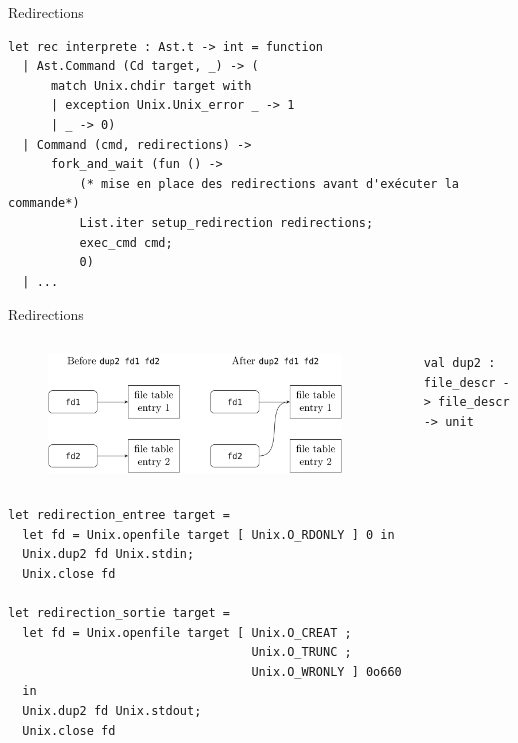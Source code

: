 \begin{frame}[fragile]{Redirections}

\begin{lstlisting}
let rec interprete : Ast.t -> int = function
  | Ast.Command (Cd target, _) -> (
      match Unix.chdir target with 
      | exception Unix.Unix_error _ -> 1 
      | _ -> 0)
  | Command (cmd, redirections) ->
      fork_and_wait (fun () -> 
          (* mise en place des redirections avant d'exécuter la commande*)
          List.iter setup_redirection redirections;
          exec_cmd cmd; 
          0)
  | ...
\end{lstlisting}
\end{frame}

\begin{frame}[fragile]{Redirections}

\begin{columns}

\begin{figure}
    \centering
    \includegraphics[width=\textwidth]{slides/images/dup2.png}
\end{figure}

\\
\begin{lstlisting}
val dup2 : file_descr -> file_descr -> unit
\end{lstlisting}

\end{columns}



\begin{lstlisting}
let redirection_entree target =
  let fd = Unix.openfile target [ Unix.O_RDONLY ] 0 in
  Unix.dup2 fd Unix.stdin;
  Unix.close fd

let redirection_sortie target =
  let fd = Unix.openfile target [ Unix.O_CREAT ; 
                                  Unix.O_TRUNC ; 
                                  Unix.O_WRONLY ] 0o660
  in
  Unix.dup2 fd Unix.stdout;
  Unix.close fd
\end{lstlisting}

\end{frame}

